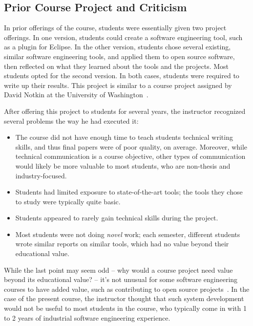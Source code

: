 \documentclass[10pt,conference]{IEEEtran}
\begin{document}
\subsection{Prior Course Project and Criticism}\label{sec:priorProj}

In prior offerings of the course,
students were essentially given two project offerings.
In one version, students could create
a software engineering tool, such as a plugin for Eclipse.
In the other version, students chose several existing,
similar software engineering tools, and applied them
to open source software, then reflected 
on what they learned about the tools and the 
projects.
Most students opted for the second version.
In both cases, students were required to write up their results.
This project is similar to a course project
assigned by David Notkin at the 
University of Washington~\cite{gradSEUW}.

After offering this project to students for 
several years, the instructor recognized several
problems the way he had executed it:

\begin{itemize}  
  \item The course did not have enough time to teach students
  		technical writing skills, and thus final papers were 
  		of poor quality, on average. Moreover, while technical
  		communication is a course objective, other types of
  		communication would likely be more valuable to most
  		students, who are non-thesis and industry-focused.   		 
  \item Students had limited exposure to state-of-the-art
  		tools; the tools they chose to study were typically
  		quite basic.
  \item Students appeared to rarely gain technical skills 
  		during the project.  
  \item Most students were not doing \emph{novel} work; each semester,
  		different students wrote similar reports on similar tools,
  		which had no value beyond their educational value. 
\end{itemize}

While the last point may seem odd -- why would a course project need
value beyond its educational value? -- it's not unusual for 
some software engineering courses to have added value,
such as contributing to open source projects~\cite{pedroni2007open,meneely2008rose}.
In the case of the present course, the instructor thought 
that such system development would not be useful to most students
in the course, who typically come in with 1 to 2 years of 
industrial software engineering experience. 
\end{document}
